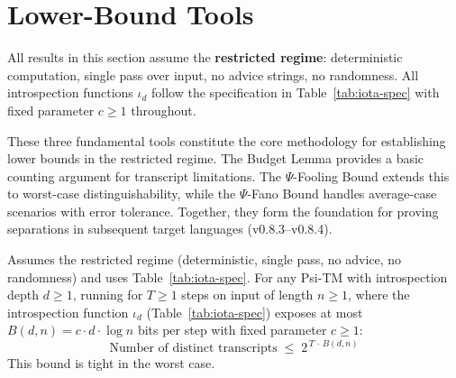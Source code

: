 
\section{Lower-Bound Tools}
\label{sec:lower-bound-tools}

\begin{remark}
All results in this section assume the \textbf{restricted regime}: deterministic computation, single pass over input, no advice strings, no randomness. All introspection functions $\iota_d$ follow the specification in Table~\ref{tab:iota-spec} with fixed parameter $c \geq 1$ throughout.
\end{remark}

These three fundamental tools constitute the core methodology for establishing lower bounds in the restricted regime. The Budget Lemma provides a basic counting argument for transcript limitations. The $\Psi$-Fooling Bound extends this to worst-case distinguishability, while the $\Psi$-Fano Bound handles average-case scenarios with error tolerance. Together, they form the foundation for proving separations in subsequent target languages (v0.8.3--v0.8.4).

\begin{lemma}
\label{lem:budget}\label{Lk:budget-lemma}\label{lemma:budget-9-2}
Assumes the restricted regime (deterministic, single pass, no advice, no randomness) and uses Table~\ref{tab:iota-spec}.
For any Psi-TM with introspection depth $d \geq 1$, running for $T \geq 1$ steps on input of length $n \geq 1$, where the introspection function $\iota_d$ (Table~\ref{tab:iota-spec}) exposes at most $B(d,n) = c \cdot d \cdot \log n$ bits per step with fixed parameter $c \geq 1$:
\begin{equation}
\label{eq:budget-bound}
\text{Number of distinct transcripts} \;\leq\; 2^{\,T\,\cdot\, B(d,n)}
\end{equation}
This bound is tight in the worst case.
\end{lemma}

